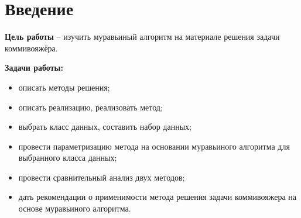 \chapter*{Введение}
\textbf{Цель работы} – изучить муравьиный алгоритм на материале решения задачи коммивояжёра.

\textbf{Задачи работы:}
\begin{itemize}
	\item описать методы решения;
	\item описать реализацию, реализовать метод;
	\item выбрать класс данных, составить набор данных;
	\item провести параметризацию метода на основании муравьиного алгоритма для выбранного класса данных;
	\item провести сравнительный анализ двух методов;
	\item дать рекомендации о применимости метода решения задачи коммивояжера на основе муравьиного алгоритма.
\end{itemize}